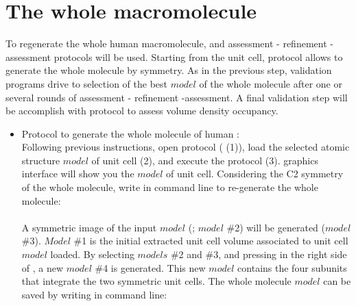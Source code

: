 \section{The whole macromolecule}
\label{wholemacromolecule}

To regenerate the whole human  macromolecule, \chimera {} and assessment - refinement -assessment protocols will be used. Starting from the unit cell, \chimera {} protocol allows to generate the whole molecule by symmetry. As in the previous step, validation programs drive to selection of the best $model$ of the whole molecule after one or several rounds of assessment - refinement -assessment. A final validation step will be accomplish with \chimera {} protocol to assess volume density occupancy.

\begin{itemize}

 \item Protocol  to generate the whole molecule of human :\\
 
 Following previous instructions, open \chimera {} protocol ( (1)), load 
 the selected atomic structure $model$ of  unit cell (2), and execute the protocol (3). \chimera graphics interface will show you the $model$ of  unit cell. Considering the C2 symmetry of the whole molecule, write in \chimera command line to re-generate the whole molecule:\\
 
 \\
 
 A symmetric image of the input $model$ (; $model$ \#2) will be generated ($model$ \#3). $Model$ \#1 is the initial extracted unit cell volume associated to  unit cell $model$ loaded. By selecting $models$ \#2 and \#3, and pressing  in the right side of , a new $model$ \#4 is generated. This new $model$ contains the four subunits that integrate the two symmetric unit cells. The whole molecule $model$ can be saved by writing in \chimera command line:\\
 
 \\
 

\end{itemize}
